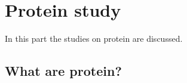 \section{Protein study}

In this part the studies on protein are discussed. 

\subsection{What are protein?}